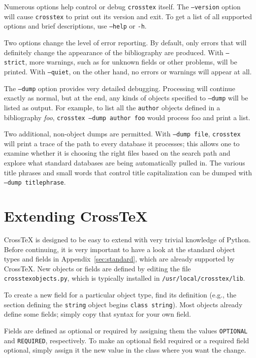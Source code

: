 \documentclass{article}
\newcommand{\XTX}{Cross\TeX}
\begin{document}
Numerous options help control or debug \texttt{crosstex} itself.  The
\texttt{--version} option will cause \texttt{crosstex} to print out its
version and exit.  To get a list of all supported options and brief
descriptions, use \texttt{--help} or \texttt{-h}.

Two options change the level of error reporting.  By default, only
errors that will definitely change the appearance of the bibliography
are produced.  With \texttt{--strict}, more warnings, such as for unknown
fields or other problems, will be printed.  With \texttt{--quiet}, on the
other hand, no errors or warnings will appear at all.

The \texttt{--dump} option provides very detailed debugging.  Processing
will continue exactly as normal, but at the end, any kinds of objects
specified to \texttt{--dump} will be listed as output.  For example, to
list all the \texttt{author} objects defined in a bibliography \textit{foo},
\texttt{crosstex --dump author foo} would process foo and print a list.

Two additional, non-object dumps are permitted.  With \texttt{--dump~file},
\texttt{crosstex} will print a trace of the path to every database it
processes; this allows one to examine whether it is choosing the right files
based on the search path and explore what standard databases are being
automatically pulled in.  The various title phrases and small words that
control title capitalization can be dumped with \texttt{--dump~titlephrase}.


\section{Extending \XTX{}\label{sec:extending}}

\XTX{} is designed to be easy to extend with very trivial knowledge
of Python. Before continuing, it is very important to have a look at
the standard object types and fields in Appendix~\ref{sec:standard},
which are already supported by \XTX{}. New objects or fields are defined
by editing the file \texttt{crosstexobjects.py}, which is typically
installed in \texttt{/usr/local/crosstex/lib}.

To create a new field for a particular object type, find its definition
(e.g., the section defining the \texttt{string} object begins
\texttt{class string}). Most objects already define some fields;
simply copy that syntax for your own field.

Fields are defined as optional or required by assigning them the
values \texttt{OPTIONAL} and \texttt{REQUIRED}, respectively.  To make
an optional field required or a required field optional, simply assign
it the new value in the class where you want the change.
\end{document}

